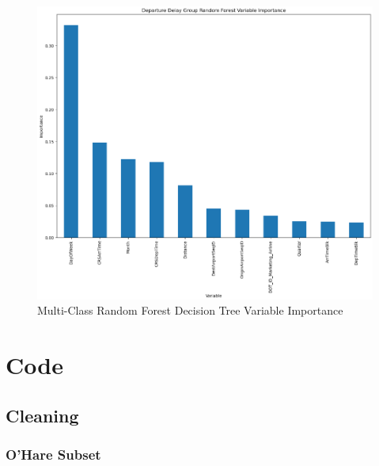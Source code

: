 \documentclass[a4paper,12pt]{article}
\begin{document}
\begin{figure}[!]
    \centering
    \includegraphics*[scale=.50]{../../img/model_rq2_rf_2.png}
    \caption[]{Multi-Class Random Forest Decision Tree Variable Importance}
    \label{fig:model:rq2:rfc_2}
\end{figure}

\FloatBarrier

\pagebreak

\section{Code}

\subsection{Cleaning}

\subsubsection{O'Hare Subset} \label{ohre subset}
\end{document}
